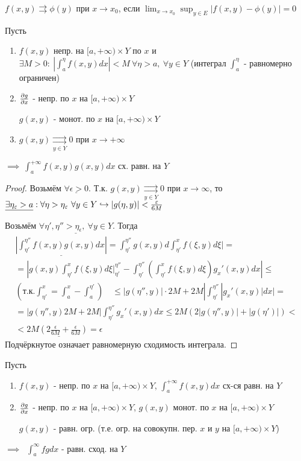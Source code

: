 \documentclass{article}
\begin{document}

\begin{definition}
  $f(x,y)\rightrightarrows \phi(y)$ при $x\to x_0$,
  если $\lim_{x\to x_0}\sup_{y\in E}|f(x,y)-\phi(y)|=0$
\end{definition}
\begin{theorem}
  Пусть
  \begin{enumerate}
    \item $f(x,y)$ непр. на $[a,+\infty)\times Y$ по $x$
      и $\exists M>0: \ |\int_{a}^{\eta}f(x,y)dx|<M \ \forall \eta>a, \ \forall y \in Y$
      (интеграл $\int_{a}^{\eta}$ - равномерно ограничен)
    \item $\frac{\partial{g}}{\partial{x}}$ - непр. по $x$ на $[a,+\infty)\times Y$

      $g(x,y)$ - монот. по $x$ на $[a,+\infty)\times Y$
    \item $g(x,y) \underset{y\in Y}{\rightrightarrows} 0$ при $x \to +\infty$ 
  \end{enumerate}
  $\implies \ \int_{a}^{+\infty}f(x,y)g(x,y)dx$ сх. равн. на $Y$
\end{theorem}
\begin{proof}
  Возьмём $\underline{\forall \epsilon > 0}$. Т.к. $g(x,y) \underset{y\in Y}{\rightrightarrows}0$ при $x\to \infty$,
  то $\underline{\exists \eta_\varepsilon >a} : \forall \eta>\eta_\varepsilon \ \forall y \in Y \hookrightarrow |g(\eta,y)| < \frac{\varepsilon}{6M}$

  Возьмём $\underline {\forall \eta', \eta'' > \eta_\epsilon, \ \forall y \in Y}$.
  Тогда
  \begin{gather*}
    \underline{|\int_{\eta'}^{\eta''}f(x,y)g(x,y)dx|}=\int_{\eta'}^{\eta''}g(x,y)d\int_{\eta'}^{x}f(\xi,y)d\xi|= \\ 
    = |g(x,y)\int_{\eta'}^{x}f(\xi,y)d\xi\big|_{\eta'}^{\eta''}-\int_{\eta'}^{\eta''}(\int_{\eta'}^{x}f(\xi,y)d\xi)g_x'(x,y)dx| \le \\ 
    (\text{т.к.} \int_{\eta'}^{x}=\int_{a}^{x}-\int_{a}^{\eta'}) \quad \le |g(\eta'',y)|\cdot 2M + 2M|\int_{\eta'}^{\eta''}|g_x'(x,y)|dx| = \\ 
    =|g(\eta'',y)2M+2M|\int_{\eta'}^{\eta''}g_x'(x,y)dx \le 2M (2|g(\eta'',y)|+|g(\eta')|) < \\ 
    \underline{< 2M(2\frac{\epsilon}{6M}+\frac{\epsilon}{6M}) = \epsilon}
  \end{gather*}
  Подчёркнутое означает равномерную сходимость интеграла.
\end{proof}
\begin{theorem}
  Пусть
  \begin{enumerate}
    \item $f(x,y)$ - непр. по $x$ на $[a,+\infty)\times Y$, $\int_{a}^{+\infty}f(x,y)dx$ сх-ся равн. на $Y$
    \item $\frac{\partial{g}}{\partial{x}}$ - непр. по $x$ на $[a,+\infty)\times Y$, $g(x,y)$ монот. по $x$ на $[a,+\infty)\times Y$

      $g(x,y)$ - равн. огр. (т.е. огр. на совокупн. пер. $x$ и $y$ на $[a,+\infty)\times Y$)
  \end{enumerate}
  $\implies$ $\ \int_{a}^{\infty}fgdx$ - равн. сход. на $Y$
\end{theorem}
\end{document}

